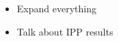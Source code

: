 \begin{itemize}
    \item Expand everything
    \item Talk about IPP results
\end{itemize}


%
%
%
%
%
%
